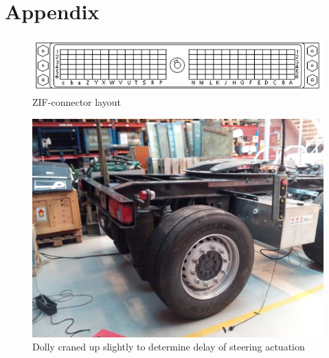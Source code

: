 \documentclass[ExampleMasters.tex]{subfiles}
\begin{document}
\clearpage
{\pagestyle{empty}\cleardoublepage}%

\appendix 
\chapter{Appendix}
\label{chap:Appendix}

\begin{figure}[h]
	\centering
	\includegraphics[width=1\linewidth]{figures/ZIF_connector}
	\caption{ZIF-connector layout}
	\label{fig:ZIF_connector}
\end{figure}


\begin{figure}[h]
\centering
\includegraphics[width=1\linewidth]{figures/dolly_craned_up}
\caption{Dolly craned up slightly to determine delay of steering actuation}
\label{fig:dolly_craned_up}
\end{figure}
\end{document}
